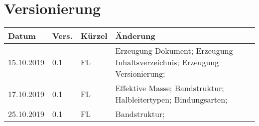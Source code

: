 \newpage
\tableofcontents

\section*{Versionierung}
\begin{tabular}{|p{2cm}|p{1cm}|p{1.5cm}|p{10.5cm}|}\hline
Datum & Vers. & Kürzel & Änderung \\ \hline
15.10.2019 & 0.1 & FL & Erzeugung Dokument; Erzeugung Inhaltsverzeichnis; Erzeugung Versionierung; \\ \hline
17.10.2019 & 0.1 & FL & Effektive Masse; Bandstruktur; Halbleitertypen;  Bindungsarten; \\ \hline
25.10.2019 & 0.1 & FL & Bandstruktur; \\ \hline
\end{tabular}
\listoffigures